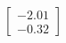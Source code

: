 \documentclass[preview]{standalone}
\begin{document}
\begin{align*}
\begin{bmatrix} -2.01 \\ -0.32 \end{bmatrix}
\end{align*}
\end{document}
